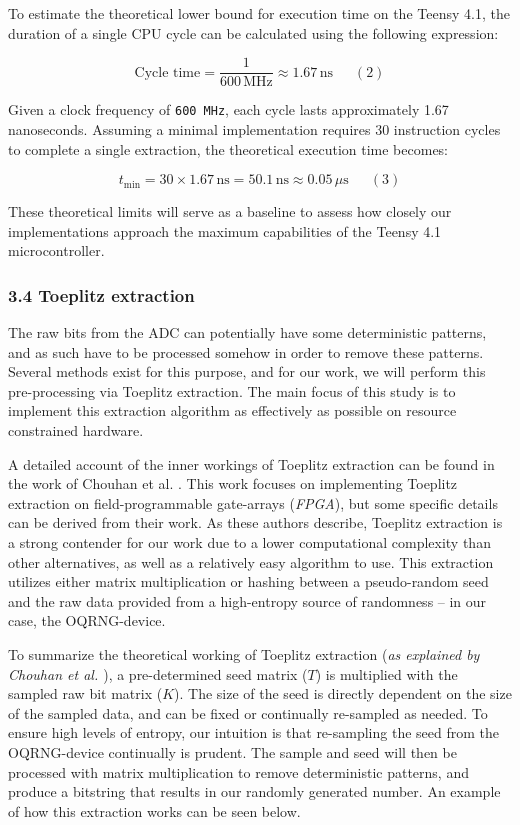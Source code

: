 \documentclass{sigchi}
\begin{document}
To estimate the theoretical lower bound for execution time on the Teensy 4.1, the duration of a single CPU cycle can be calculated using the following expression:

\[
\text{Cycle time} = \frac{1}{600\, \mathrm{MHz}} \approx 1.67\, \mathrm{ns} \phantom{123}(2)
\]

Given a clock frequency of \texttt{600\ MHz}, each cycle lasts approximately 1.67 nanoseconds. Assuming a minimal implementation requires 30 instruction cycles to complete a single extraction, the theoretical execution time becomes:

\[
t_{\text{min}} = 30 \times 1.67\,\mathrm{ns} = 50.1\,\mathrm{ns} \approx 0.05\,\mu\mathrm{s} \phantom{123}(3)
\]

These theoretical limits will serve as a baseline to assess how closely our implementations approach the maximum capabilities of the Teensy 4.1 microcontroller.

\subsubsection{3.4 Toeplitz extraction}\label{toeplitz-extraction}

The raw bits from the ADC can potentially have some deterministic patterns, and as such have to be processed somehow in order to remove these patterns. Several methods exist for this purpose, and for our work, we will perform this pre-processing via Toeplitz extraction. The main focus of this study is to implement this extraction algorithm as effectively as possible on resource constrained hardware.

A detailed account of the inner workings of Toeplitz extraction can be found in the work of Chouhan et al. \cite{toeplitz-desc}. This work focuses on implementing Toeplitz extraction on field-programmable gate-arrays (\emph{FPGA}), but some specific details can be derived from their work. As these authors describe, Toeplitz extraction is a strong contender for our work due to a lower computational complexity than other alternatives, as well as a relatively easy algorithm to use. This extraction utilizes either matrix multiplication or hashing between a pseudo-random seed and the raw data provided from a high-entropy source of randomness -- in our case, the OQRNG-device.

To summarize the theoretical working of Toeplitz extraction (\emph{as explained by Chouhan et al. \cite{toeplitz-desc}}), a pre-determined seed matrix (\(T\)) is multiplied with the sampled raw bit matrix (\(K\)). The size of the seed is directly dependent on the size of the sampled data, and can be fixed or continually re-sampled as needed. To ensure high levels of entropy, our intuition is that re-sampling the seed from the OQRNG-device continually is prudent. The sample and seed will then be processed with matrix multiplication to remove deterministic patterns, and produce a bitstring that results in our randomly generated number. An example of how this extraction works can be seen below.
\end{document}
